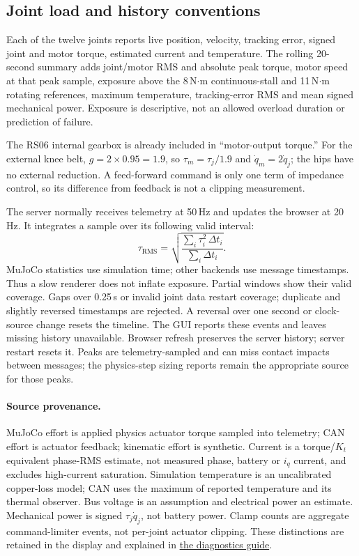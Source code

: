 \documentclass[11pt,a4paper]{article}
\begin{document}
\subsection{Joint load and history conventions}

Each of the twelve joints reports live position, velocity, tracking error,
signed joint and motor torque, estimated current and temperature. The rolling
20-second summary adds joint/motor RMS and absolute peak torque, motor speed
at that peak sample, exposure above the 8\,N$\cdot$m continuous-stall and
11\,N$\cdot$m rotating references, maximum temperature, tracking-error RMS
and mean signed mechanical power. Exposure is descriptive, not an allowed
overload duration or prediction of failure.

The RS06 internal gearbox is already included in ``motor-output torque.'' For
the external knee belt, $g=2\times0.95=1.9$, so
$\tau_m=\tau_j/1.9$ and $\dot q_m=2\dot q_j$; the hips have no external
reduction. A feed-forward command is only one term of impedance control, so
its difference from feedback is not a clipping measurement.

The server normally receives telemetry at 50\,Hz and updates the browser at
20\,Hz. It integrates a sample over its following valid interval:
\[
 \tau_{\mathrm{RMS}}=
 \sqrt{\frac{\sum_i\tau_i^2\,\Delta t_i}{\sum_i\Delta t_i}}.
\]
MuJoCo statistics use simulation time; other backends use message timestamps.
Thus a slow renderer does not inflate exposure. Partial windows show their
valid coverage. Gaps over 0.25\,s or invalid joint data restart coverage;
duplicate and slightly reversed timestamps are rejected. A reversal over one
second or clock-source change resets the timeline. The GUI reports these
events and leaves missing history unavailable. Browser refresh preserves the
server history; server restart resets it. Peaks are telemetry-sampled and can
miss contact impacts between messages; the physics-step sizing reports remain
the appropriate source for those peaks.

\paragraph{Source provenance.} MuJoCo effort is applied physics actuator torque
sampled into telemetry; CAN effort is actuator feedback; kinematic effort is
synthetic. Current is a torque/$K_t$ equivalent phase-RMS estimate, not measured
phase, battery or $i_q$ current, and excludes high-current saturation.
Simulation temperature is an uncalibrated copper-loss model; CAN uses the
maximum of reported temperature and its thermal observer. Bus voltage is an
assumption and electrical power an estimate. Mechanical power is signed
$\tau_j\dot q_j$, not battery power. Clamp counts are aggregate command-limiter
events, not per-joint actuator clipping. These distinctions are retained in
the display and explained in \href{gui_telemetry.md}{the diagnostics guide}.
\end{document}
